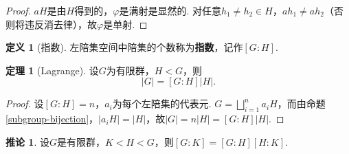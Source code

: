 \documentclass[12pt]{ctexart}
\theoremstyle{definition}
\newtheorem{definition}{定义}[section]
\newtheorem{theorem}{定理}[section]
\newtheorem{corollary}{推论}[section]
\theoremstyle{plain}
\begin{document}
\begin{proof}
	$aH$是由$H$得到的，$\varphi$是满射是显然的. 对任意$h_1\neq h_2\in H$，$ah_1\neq ah_2$（否则将违反消去律），故$\varphi$是单射.
\end{proof}
\begin{definition}[指数]
	左陪集空间中陪集的个数称为\textbf{指数}，记作$\left[G:H\right]$.
\end{definition}
\begin{theorem}[Lagrange]
	设$G$为有限群，$H<G$，则
	$$|G|=\left[G:H\right]|H|.$$
\end{theorem}
\begin{proof}
	设$\left[G:H\right]=n$，$a_i$为每个左陪集的代表元. $G=\bigsqcup_{i=1}^{n}a_iH$，而由命题\ref{subgroup-bijection}，$|a_iH|=|H|$，故$|G|=n|H|=\left[G:H\right]|H|$.
\end{proof}
\begin{corollary}
	设$G$是有限群，$K<H<G$，则$\left[G:K\right]=\left[G:H\right]\left[H:K\right]$.
\end{corollary}
\end{document}
